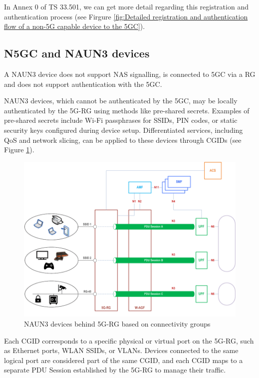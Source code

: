 In Annex 0 of TS 33.501, we can get more detail regarding this registration and authentication process (see Firgure \ref{fig:Detailed registration and authentication flow of a non-5G capable device to the 5GC}).

\subsection{\ac{N5GC} and \ac{NAUN3} devices}

A \ac{NAUN3} device does not support \ac{NAS} signalling, is connected to \ac{5GC} via a \ac{RG} and does not support authentication with the \ac{5GC}.%

\ac{NAUN3} devices, which cannot be authenticated by the \ac{5GC}, may be locally authenticated by the \ac{5G-RG} using methods like pre-shared secrets. Examples of pre-shared secrets include Wi-Fi passphrases for \acp{SSID}, \ac{PIN} codes, or static security keys configured during device setup. Differentiated services, including \ac{QoS} and network slicing, can be applied to these devices through \acp{CGID} (see Figure \ref{fig:NAUN3 devices behind 5G-RG based on connectivity groups}).

\begin{figure}
    \centering
    \includegraphics[width=0.75\linewidth]{figs/NAUN3 devices behind 5G-RG based on connectivity groups.png}
    \caption{NAUN3 devices behind \ac{5G-RG} based on connectivity groups}
    \label{fig:NAUN3 devices behind 5G-RG based on connectivity groups}
\end{figure}

Each \ac{CGID} corresponds to a specific physical or virtual port on the \ac{5G-RG}, such as Ethernet ports, \ac{WLAN} \acp{SSID}, or \acp{VLAN}. Devices connected to the same logical port are considered part of the same \ac{CGID}, and each \ac{CGID} maps to a separate \ac{PDU} Session established by the \ac{5G-RG} to manage their traffic.

